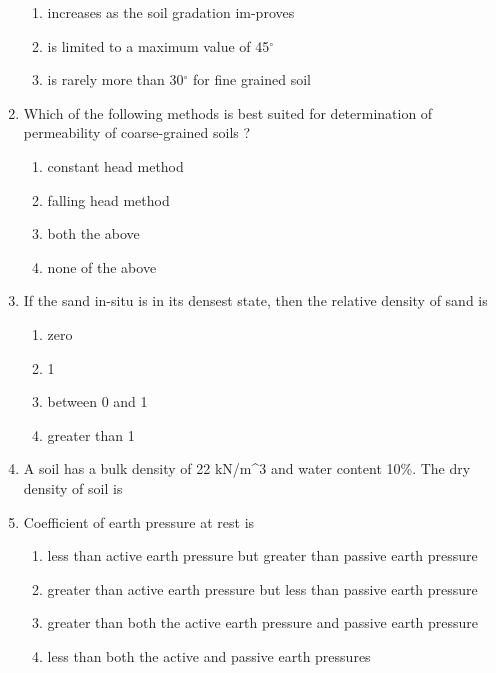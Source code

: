 \documentclass[11pt,a4paper]{article}
\begin{document}
\begin{enumerate}
\begin{enumerate}[label=\Alph*.]
\item{increases as the soil gradation im-proves}
\item{is limited to a maximum value of 45$^\circ$}
\item{is rarely more than 30$^\circ$ for fine grained soil}
\end{enumerate}
\item{Which of the following methods is best suited for determination of permeability of coarse-grained soils ?}
\begin{enumerate}[label=\Alph*.]
\item{constant head method}
\item{falling head method}
\item{both the above}
\item{none of the above}
\end{enumerate}
\item{If the sand in-situ is in its densest state, then the relative density of sand is}
\begin{enumerate}[label=\Alph*.]
\item{zero}
\item{1}
\item{between 0 and 1}
\item{greater than 1}
\end{enumerate}
\item{A soil has a bulk density of 22 kN/m\^{}3 and water content 10\%. The dry density of soil is}
\\
\item{Coefficient of earth pressure at rest is}
\begin{enumerate}[label=\Alph*.]
\item{less than active earth pressure but greater than passive earth pressure}
\item{greater than active earth pressure but less than passive earth pressure}
\item{greater than both the active earth pressure and passive earth pressure}
\item{less than both the active and passive earth pressures}
\end{enumerate}

\end{enumerate}
\end{document}
